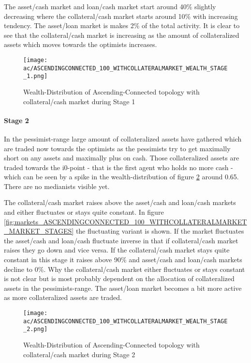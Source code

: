 \documentclass[Bachelorarbeit.tex]{subfiles}
\begin{document}
\medskip

The asset/cash market and loan/cash market start around 40\% slightly decreasing where the collateral/cash market starts around 10\% with increasing tendency. The asset/loan market is makes 2\% of the total activity. It is clear to see that the collateral/cash market is increasing as the amount of collateralized assets which moves towards the optimists increases.
		
\begin{figure}[H]
	\centering
  \texttt{[image: ac/ASCENDINGCONNECTED\_100\_WITHCOLLATERALMARKET\_WEALTH\_STAGE\_1.png]}
  	\caption{Wealth-Distribution of Ascending-Connected topology with collateral/cash market during Stage 1}
	\label{fig:wealth_ASCENDINGCONNECTED_100_WITHCOLLATERALMARKET_WEALTH_STAGE_1}
\end{figure}

\paragraph{Stage 2}
In the pessimist-range large amount of collateralized assets have gathered which are traded now towards the optimists as the pessimists try to get maximally short on any assets and maximally plus on cash. Those collateralized assets are traded towards the i0-point - that is the first agent who holds no more cash - which can be seen by a spike in the wealth-distribution of figure \ref{fig:wealth_ASCENDINGCONNECTED_100_WITHCOLLATERALMARKET_WEALTH_STAGE_2} around 0.65.
There are no medianists visible yet.

\medskip

The collateral/cash market raises above the asset/cash and loan/cash markets and either fluctuates or stays quite constant. In figure \ref{fig:markets_ASCENDINGCONNECTED_100_WITHCOLLATERALMARKET_MARKET_STAGES} the fluctuating variant is shown. If the market fluctuates the asset/cash and loan/cash fluctuate inverse in that if collateral/cash market raises they go down and vice versa. If the collateral/cash market stays quite constant in this stage it raises above 90\% and asset/cash and loan/cash markets decline to 0\%. Why the collateral/cash market either fluctuates or stays constant is not clear but is most probably dependent on the allocation of collateralized assets in the pessimists-range. The asset/loan market becomes a bit more active as more collateralized assets are traded.
		
\begin{figure}[H]
	\centering
  \texttt{[image: ac/ASCENDINGCONNECTED\_100\_WITHCOLLATERALMARKET\_WEALTH\_STAGE\_2.png]}
  	\caption{Wealth-Distribution of Ascending-Connected topology with collateral/cash market during Stage 2}
	\label{fig:wealth_ASCENDINGCONNECTED_100_WITHCOLLATERALMARKET_WEALTH_STAGE_2}
\end{figure}
\end{document}
